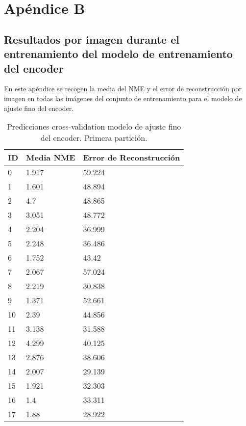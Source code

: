 
\chapter{Apéndice B}\label{ap:apendiceB}

\section*{Resultados por imagen durante el entrenamiento del modelo de entrenamiento del encoder}

En este apéndice se recogen la media del NME y el error de reconstrucción por imagen en todas las imágenes del conjunto de entrenamiento para el modelo de ajuste fino del encoder.

\begin{table}[!ht]
    \centering
    \caption{Predicciones cross-validation modelo de ajuste fino del encoder. Primera partición.}
    \begin{tabular}{|l|l|l|}
    \hline
    \cellcolor{gray!25}\textbf{ID} & \cellcolor{gray!25}\textbf{Media NME} & \cellcolor{gray!25}\textbf{Error de Reconstrucción} \\ \hline
        0 & 1.917 & 59.224 \\ \hline
        1 & 1.601 & 48.894 \\ \hline
        2 & 4.7 & 48.865 \\ \hline
        3 & 3.051 & 48.772 \\ \hline
        4 & 2.204 & 36.999 \\ \hline
        5 & 2.248 & 36.486 \\ \hline
        6 & 1.752 & 43.42 \\ \hline
        7 & 2.067 & 57.024 \\ \hline
        8 & 2.219 & 30.838 \\ \hline
        9 & 1.371 & 52.661 \\ \hline
        10 & 2.39 & 44.856 \\ \hline
        11 & 3.138 & 31.588 \\ \hline
        12 & 4.299 & 40.125 \\ \hline
        13 & 2.876 & 38.606 \\ \hline
        14 & 2.007 & 29.139 \\ \hline
        15 & 1.921 & 32.303 \\ \hline
        16 & 1.4 & 33.311 \\ \hline
        17 & 1.88 & 28.922 \\ \hline

\end{tabular}
\end{table}
